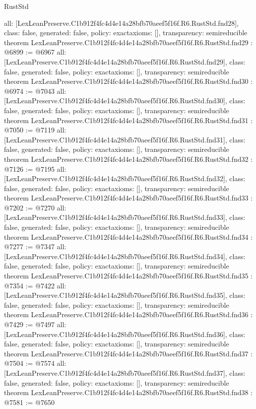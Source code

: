 \begin{lexlean}{RustStd}
\begin{coremodule}
{  all: [LexLeanPreserve.C1b912f4fc4d4e14a28bfb70aeef5f16f.R6.RustStd.fnd28],
  class: false,
  generated: false,
  policy: exact{axioms: []},
  transparency: semireducible
}
theorem LexLeanPreserve.C1b912f4fc4d4e14a28bfb70aeef5f16f.R6.RustStd.fnd29 : @6899 := @6967 {
  all: [LexLeanPreserve.C1b912f4fc4d4e14a28bfb70aeef5f16f.R6.RustStd.fnd29],
  class: false,
  generated: false,
  policy: exact{axioms: []},
  transparency: semireducible
}
theorem LexLeanPreserve.C1b912f4fc4d4e14a28bfb70aeef5f16f.R6.RustStd.fnd30 : @6974 := @7043 {
  all: [LexLeanPreserve.C1b912f4fc4d4e14a28bfb70aeef5f16f.R6.RustStd.fnd30],
  class: false,
  generated: false,
  policy: exact{axioms: []},
  transparency: semireducible
}
theorem LexLeanPreserve.C1b912f4fc4d4e14a28bfb70aeef5f16f.R6.RustStd.fnd31 : @7050 := @7119 {
  all: [LexLeanPreserve.C1b912f4fc4d4e14a28bfb70aeef5f16f.R6.RustStd.fnd31],
  class: false,
  generated: false,
  policy: exact{axioms: []},
  transparency: semireducible
}
theorem LexLeanPreserve.C1b912f4fc4d4e14a28bfb70aeef5f16f.R6.RustStd.fnd32 : @7126 := @7195 {
  all: [LexLeanPreserve.C1b912f4fc4d4e14a28bfb70aeef5f16f.R6.RustStd.fnd32],
  class: false,
  generated: false,
  policy: exact{axioms: []},
  transparency: semireducible
}
theorem LexLeanPreserve.C1b912f4fc4d4e14a28bfb70aeef5f16f.R6.RustStd.fnd33 : @7202 := @7270 {
  all: [LexLeanPreserve.C1b912f4fc4d4e14a28bfb70aeef5f16f.R6.RustStd.fnd33],
  class: false,
  generated: false,
  policy: exact{axioms: []},
  transparency: semireducible
}
theorem LexLeanPreserve.C1b912f4fc4d4e14a28bfb70aeef5f16f.R6.RustStd.fnd34 : @7277 := @7347 {
  all: [LexLeanPreserve.C1b912f4fc4d4e14a28bfb70aeef5f16f.R6.RustStd.fnd34],
  class: false,
  generated: false,
  policy: exact{axioms: []},
  transparency: semireducible
}
theorem LexLeanPreserve.C1b912f4fc4d4e14a28bfb70aeef5f16f.R6.RustStd.fnd35 : @7354 := @7422 {
  all: [LexLeanPreserve.C1b912f4fc4d4e14a28bfb70aeef5f16f.R6.RustStd.fnd35],
  class: false,
  generated: false,
  policy: exact{axioms: []},
  transparency: semireducible
}
theorem LexLeanPreserve.C1b912f4fc4d4e14a28bfb70aeef5f16f.R6.RustStd.fnd36 : @7429 := @7497 {
  all: [LexLeanPreserve.C1b912f4fc4d4e14a28bfb70aeef5f16f.R6.RustStd.fnd36],
  class: false,
  generated: false,
  policy: exact{axioms: []},
  transparency: semireducible
}
theorem LexLeanPreserve.C1b912f4fc4d4e14a28bfb70aeef5f16f.R6.RustStd.fnd37 : @7504 := @7574 {
  all: [LexLeanPreserve.C1b912f4fc4d4e14a28bfb70aeef5f16f.R6.RustStd.fnd37],
  class: false,
  generated: false,
  policy: exact{axioms: []},
  transparency: semireducible
}
theorem LexLeanPreserve.C1b912f4fc4d4e14a28bfb70aeef5f16f.R6.RustStd.fnd38 : @7581 := @7650 {
}
\end{coremodule}
\end{lexlean}
